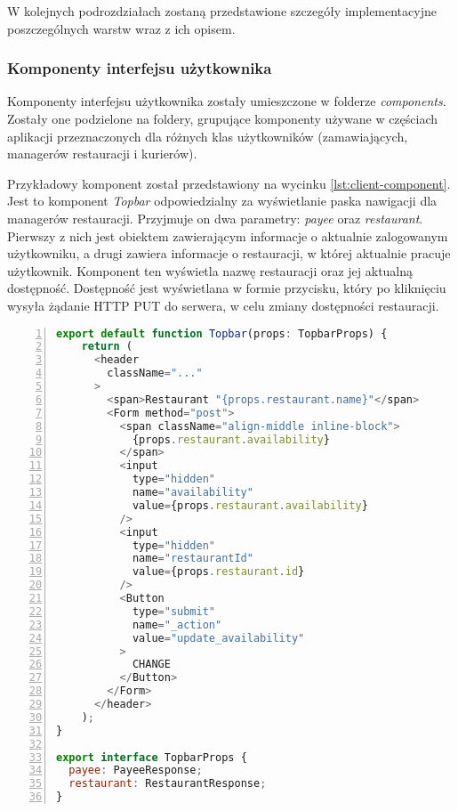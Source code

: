 W kolejnych podrozdziałach zostaną przedstawione szczegóły implementacyjne poszczególnych warstw wraz z ich opisem.

\subsubsection{Komponenty interfejsu użytkownika}

Komponenty interfejsu użytkownika zostały umieszczone w folderze \textit{components}. Zostały one podzielone na foldery, grupujące komponenty używane w częściach aplikacji przeznaczonych dla różnych klas użytkowników (zamawiających, managerów restauracji i kurierów).

Przykładowy komponent został przedstawiony na wycinku \ref{lst:client-component}. Jest to komponent \textit{Topbar} odpowiedzialny za wyświetlanie paska nawigacji dla managerów restauracji. Przyjmuje on dwa parametry: \textit{payee} oraz \textit{restaurant}. Pierwszy z nich jest obiektem zawierającym informacje o aktualnie zalogowanym użytkowniku, a drugi zawiera informacje o restauracji, w której aktualnie pracuje użytkownik. Komponent ten wyświetla nazwę restauracji oraz jej aktualną dostępność. Dostępność jest wyświetlana w formie przycisku, który po kliknięciu wysyła żądanie HTTP PUT do serwera, w celu zmiany dostępności restauracji.

\begin{lstlisting}[caption={Kod komponentu interfejsu użytkownika - pasek nawigacji managera restauracji},label={lst:client-component},captionpos=b,language=JavaScript,numbers=left,showstringspaces=false]
export default function Topbar(props: TopbarProps) {
    return (
      <header
        className="..."
      >
        <span>Restaurant "{props.restaurant.name}"</span>
        <Form method="post">
          <span className="align-middle inline-block">
            {props.restaurant.availability}
          </span>
          <input
            type="hidden"
            name="availability"
            value={props.restaurant.availability}
          />
          <input
            type="hidden"
            name="restaurantId"
            value={props.restaurant.id}
          />
          <Button 
            type="submit" 
            name="_action" 
            value="update_availability"
          >
            CHANGE
          </Button>
        </Form>
      </header>
    );
}
  
export interface TopbarProps {
  payee: PayeeResponse;
  restaurant: RestaurantResponse;
}
\end{lstlisting}

